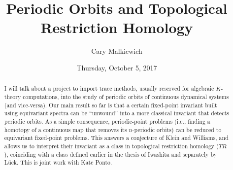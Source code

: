 \documentclass{UAmathtalk}
\author{Cary Malkiewich}
\title{Periodic Orbits and Topological Restriction Homology}
\date{Thursday, October 5, 2017}
\begin{document}
\maketitle

\begin{abstract}
I will talk about a project to import trace methods, usually reserved for algebraic $K$-theory computations, into the study of periodic orbits of continuous dynamical systems (and vice-versa). Our main result so far is that a certain fixed-point invariant built using equivariant spectra can be ``unwound'' into a more classical invariant that detects periodic orbits. As a simple consequence, periodic-point problems (i.e., finding a homotopy of a continuous map that removes its $n$-periodic orbits) can be reduced to equivariant fixed-point problems. This answers a conjecture of Klein and Williams, and allows us to interpret their invariant as a class in topological restriction homology ($TR$), coinciding with a class defined earlier in the thesis of Iwashita and separately by Lück. This is joint work with Kate Ponto.
\end{abstract}
\end{document}
